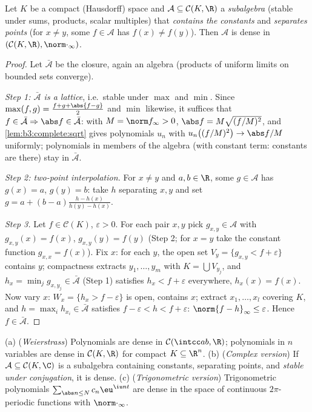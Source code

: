 \begin{theorem}
\label{thm:b3:complete:stoneweierstrass}
Let $K$ be a compact (Hausdorff) space and $\mathcal A \subseteq
\mathcal C(K, \R)$ a \emph{subalgebra} (stable under sums,
products, scalar multiples) that \emph{contains the constants}
and \emph{separates points} (for $x \neq y$, some $f \in
\mathcal A$ has $f(x) \neq f(y)$). Then $\mathcal A$ is dense in
$(\mathcal C(K,\R), \norm\cdot_\infty)$.
\end{theorem}

\begin{proof}
Let $\bar{\mathcal A}$ be the closure, again an algebra
(products of uniform limits on bounded sets converge).

\emph{Step 1: $\bar{\mathcal A}$ is a lattice}, i.e.\ stable
under $\max$ and $\min$. Since $\max(f,g) = \frac{f + g +
\abs{f-g}}2$ and $\min$ likewise, it suffices that $f \in
\bar{\mathcal A} \Rightarrow \abs f \in \bar{\mathcal A}$: with
$M = \norm f_\infty > 0$, $\abs f = M\sqrt{(f/M)^2}$, and
\cref{lem:b3:complete:sqrt} gives polynomials $u_n$ with
$u_n\bigl((f/M)^2\bigr) \to \abs f/M$ uniformly; polynomials in
members of the algebra (with constant term: constants are
there) stay in $\bar{\mathcal A}$.

\emph{Step 2: two-point interpolation.} For $x \neq y$ and $a,
b \in \R$, some $g \in \mathcal A$ has $g(x) = a$, $g(y) = b$:
take $h$ separating $x, y$ and set $g = a + (b -
a)\frac{h - h(x)}{h(y) - h(x)}$.

\emph{Step 3.} Let $f \in \mathcal C(K)$, $\varepsilon > 0$.
For each pair $x, y$ pick $g_{x,y} \in \mathcal A$ with
$g_{x,y}(x) = f(x)$, $g_{x,y}(y) = f(y)$ (Step 2; for $x = y$
take the constant function $g_{x,x} = f(x)$).
Fix $x$: for each $y$, the open set $V_y = \{g_{x,y} < f +
\varepsilon\}$ contains $y$; compactness extracts $y_1, \dots,
y_m$ with $K = \bigcup V_{y_j}$, and $h_x = \min_j g_{x, y_j}
\in \bar{\mathcal A}$ (Step 1) satisfies $h_x < f +
\varepsilon$ everywhere, $h_x(x) = f(x)$. Now vary $x$: $W_x =
\{h_x > f - \varepsilon\}$ is open, contains $x$; extract $x_1,
\dots, x_l$ covering $K$, and $h = \max_i h_{x_i} \in
\bar{\mathcal A}$ satisfies $f - \varepsilon < h < f +
\varepsilon$: $\norm{f - h}_\infty \leq \varepsilon$. Hence
$f \in \bar{\mathcal A}$.
\end{proof}

\begin{corollary}\label{cor:b3:complete:weierstrass}
(a) (\emph{Weierstrass}) Polynomials are dense in $\mathcal
C(\intcc ab, \R)$; polynomials in $n$ variables are dense in
$\mathcal C(K, \R)$ for compact $K \subseteq \R^n$.
(b) (\emph{Complex version}) If $\mathcal A \subseteq \mathcal
C(K, \C)$ is a subalgebra containing constants, separating
points, and \emph{stable under conjugation}, it is dense.
(c) (\emph{Trigonometric version}) Trigonometric polynomials
$\sum_{\abs n \leq N}c_n\eu^{\iu n t}$ are dense in the space of
continuous $2\pi$-periodic functions with
$\norm\cdot_\infty$.
\end{corollary}

